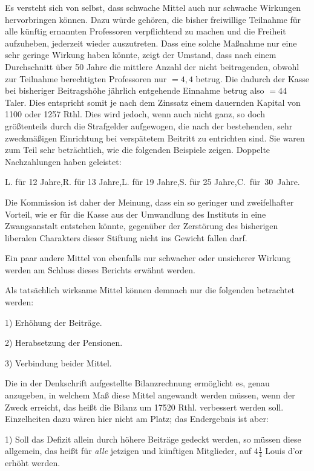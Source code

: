 Es versteht sich von selbst, dass schwache Mittel auch nur schwache Wirkungen hervorbringen können. Dazu würde gehören, die bisher freiwillige Teilnahme für alle künftig ernannten Professoren verpflichtend zu machen und die Freiheit aufzuheben, jederzeit wieder auszutreten. Dass eine solche Maßnahme nur eine sehr geringe Wirkung haben könnte, zeigt der Umstand, dass nach einem Durchschnitt über 50 Jahre die mittlere Anzahl der nicht beitragenden, obwohl zur Teilnahme berechtigten Professoren nur \(=4{,}4\) betrug. Die dadurch der Kasse bei bisheriger Beitragshöhe jährlich entgehende Einnahme betrug also \(=44\) Taler. Dies entspricht somit je nach dem Zinssatz einem dauernden Kapital von 1100 oder 1257 Rthl. Dies wird jedoch, wenn auch nicht ganz, so doch größtenteils durch die Strafgelder aufgewogen, die nach der bestehenden, sehr zweckmäßigen Einrichtung bei verspätetem Beitritt zu entrichten sind. Sie waren zum Teil sehr beträchtlich, wie die folgenden Beispiele zeigen. Doppelte Nachzahlungen haben geleistet:
\begin{center}
L. für 12 Jahre,\quad R. für 13 Jahre,\quad L. für 19 Jahre,\quad S. für 25 Jahre,\quad \mbox{C. für 30 Jahre.}
\end{center}
\noindent\hspace*{\parindent}Die Kommission ist daher der Meinung, dass ein so geringer und zweifelhafter Vorteil, wie er für die Kasse aus der Umwandlung des Instituts in eine Zwangsanstalt entstehen könnte, gegenüber der Zerstörung des bisherigen liberalen Charakters dieser Stiftung nicht ins Gewicht fallen darf.

Ein paar andere Mittel von ebenfalls nur schwacher oder unsicherer Wirkung werden am Schluss dieses Berichts erwähnt werden.

Als tatsächlich wirksame Mittel können demnach nur die folgenden betrachtet werden:

1) Erhöhung der Beiträge.

2) Herabsetzung der Pensionen.

3) Verbindung beider Mittel.

Die in der Denkschrift aufgestellte Bilanzrechnung ermöglicht es, genau anzugeben, in welchem Maß diese Mittel angewandt werden müssen, wenn der Zweck erreicht, das heißt die Bilanz um 17520 Rthl. verbessert werden soll. Einzelheiten dazu wären hier nicht am Platz; das Endergebnis ist aber:

1) Soll das Defizit allein durch höhere Beiträge gedeckt werden, so müssen diese allgemein, das heißt für \textit{alle} jetzigen und künftigen Mitglieder, auf \(4\tfrac{1}{4}\) Louis d'or erhöht werden.

